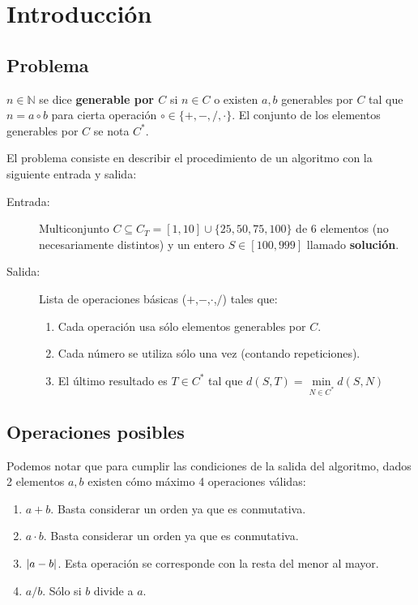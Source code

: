 \section{Introducción}
\subsection{Problema}

\begin{definition}
	$n \in \mathbb{N}$ se dice \textbf{generable por $C$} si $n \in C$ o
	existen $a,b$ generables por $C$ tal que $n = a \circ b$ para cierta operación
	$\circ \in \{+,-,/,\cdot \}$. El conjunto de los elementos generables por $C$ se nota $C^{\ast}$.
\end{definition}

El problema consiste en describir el procedimiento de un algoritmo con la
siguiente entrada y salida:

\begin{description}
	\item[Entrada:] Multiconjunto $C \subseteq C_T = [1,10] \cup \{ 25, 50, 75, 100\}$
	de 6 elementos (no necesariamente distintos) y un entero $S \in [100, 999]$ llamado
	\textbf{solución}.
	\item[Salida:] Lista de operaciones básicas ($+$,$-$,$\cdot$,$/$) tales que:
	\begin{enumerate}
		\item Cada operación usa sólo elementos generables por $C$.
		\item Cada número se utiliza sólo una vez (contando repeticiones).
		\item El último resultado es $T \in C^{\ast}$ tal que $d(S,T) = \underset{N \in C^{\ast}}{\min} d(S,N)$
	\end{enumerate}
\end{description}

\subsection{Operaciones posibles}

Podemos notar que para cumplir las condiciones de la salida del algoritmo,
dados 2 elementos $a,b$ existen cómo máximo 4 operaciones válidas:

\begin{enumerate}
	\item $a+b$. Basta considerar un orden ya que es conmutativa.
	\item $a\cdot b$. Basta considerar un orden ya que es conmutativa.
	\item $|a-b|$. Esta operación se corresponde con la resta del menor al mayor.
	\item $a/b$. Sólo si $b$ divide a $a$.
\end{enumerate}



